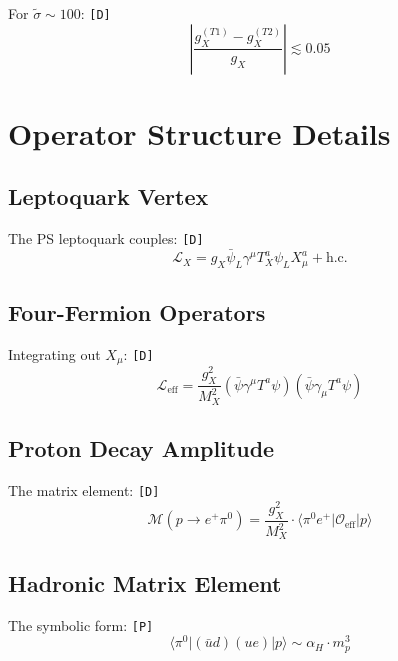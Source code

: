 \documentclass[11pt,a4paper]{article}
\newcommand{\tagD}{\textcolor{green!50!black}{\texttt{[D]}}}
\newcommand{\tagP}{\textcolor{orange!80!black}{\texttt{[P]}}}
\theoremstyle{definition}
\begin{document}
For $\tilde{\sigma} \sim 100$: \tagD{}
\begin{equation}
\label{eq:app-gx-bound}
\left|\frac{g_X^{(T1)} - g_X^{(T2)}}{g_X}\right| \lesssim 0.05
\end{equation}

\section{Operator Structure Details}
\label{app:operators}

\subsection{Leptoquark Vertex}
\label{app:lq-vertex}

The PS leptoquark couples: \tagD{}
\begin{equation}
\label{eq:app-lq-coupling}
\mathcal{L}_{X} = g_X \bar{\psi}_L \gamma^\mu T^a_X \psi_L X_\mu^a + \text{h.c.}
\end{equation}

\subsection{Four-Fermion Operators}
\label{app:four-fermion}

Integrating out $X_\mu$: \tagD{}
\begin{equation}
\label{eq:app-four-ferm}
\mathcal{L}_{\text{eff}} = \frac{g_X^2}{M_X^2} (\bar{\psi} \gamma^\mu T^a \psi)(\bar{\psi} \gamma_\mu T^a \psi)
\end{equation}

\subsection{Proton Decay Amplitude}
\label{app:decay-amp}

The matrix element: \tagD{}
\begin{equation}
\label{eq:app-matrix-elem}
\mathcal{M}(p \to e^+ \pi^0) = \frac{g_X^2}{M_X^2} \cdot \langle \pi^0 e^+ | \mathcal{O}_{\text{eff}} | p \rangle
\end{equation}

\subsection{Hadronic Matrix Element}
\label{app:hadronic-me}

The symbolic form: \tagP{}
\begin{equation}
\label{eq:app-hadronic-me}
\langle \pi^0 | (\bar{u}d)(ue) | p \rangle \sim \alpha_H \cdot m_p^3
\end{equation}
\end{document}
